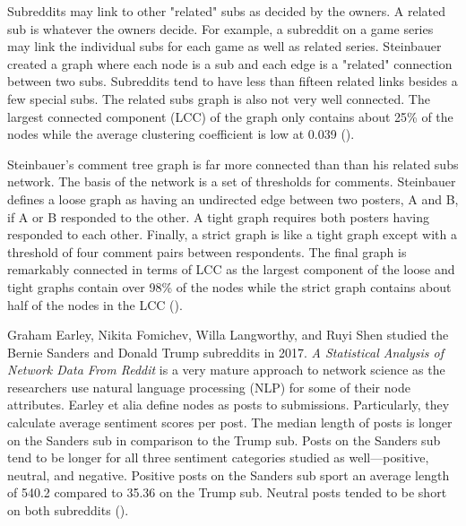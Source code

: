 \documentclass[12pt, a4paper]{article}
\begin{document}
Subreddits may link to other "related" subs as decided by the owners. A related sub is whatever the owners decide. For example, a subreddit on a game series may link the individual subs for each game as well as related series. Steinbauer created a graph where each node is a sub and each edge is a "related" connection between two subs. Subreddits tend to have less than fifteen related links besides a few special subs. The related subs graph is also not very well connected. The largest connected component (LCC) of the graph only contains about 25\% of the nodes while the average clustering coefficient is low at 0.039 (\cite{tbower_2011}).

Steinbauer's comment tree graph is far more connected than than his related subs network. The basis of the network is a set of thresholds for comments. Steinbauer defines a loose graph as having an undirected edge between two posters, A and B, if A or B responded to the other. A tight graph requires both posters having responded to each other. Finally, a strict graph is like a tight graph except with a threshold of four comment pairs between respondents. The final graph is remarkably connected in terms of LCC as the largest component of the loose and tight graphs contain over 98\% of the nodes while the strict graph contains about half of the nodes in the LCC (\cite{tbower_2011}).

Graham Earley, Nikita Fomichev, Willa Langworthy, and Ruyi Shen studied the Bernie Sanders and Donald Trump subreddits in 2017. \textit{A Statistical Analysis of Network Data From Reddit} is a very mature approach to network science as the researchers use natural language processing (NLP) for some of their node attributes. Earley et alia define nodes as posts to submissions. Particularly, they calculate average sentiment scores per post. The median length of posts is longer on the Sanders sub in comparison to the Trump sub. Posts on the Sanders sub tend to be longer for all three sentiment categories studied as well---positive, neutral, and negative. Positive posts on the Sanders sub sport an average length of 540.2 compared to 35.36 on the Trump sub. Neutral posts tended to be short on both subreddits (\cite{causeweb2017}).
\end{document}
